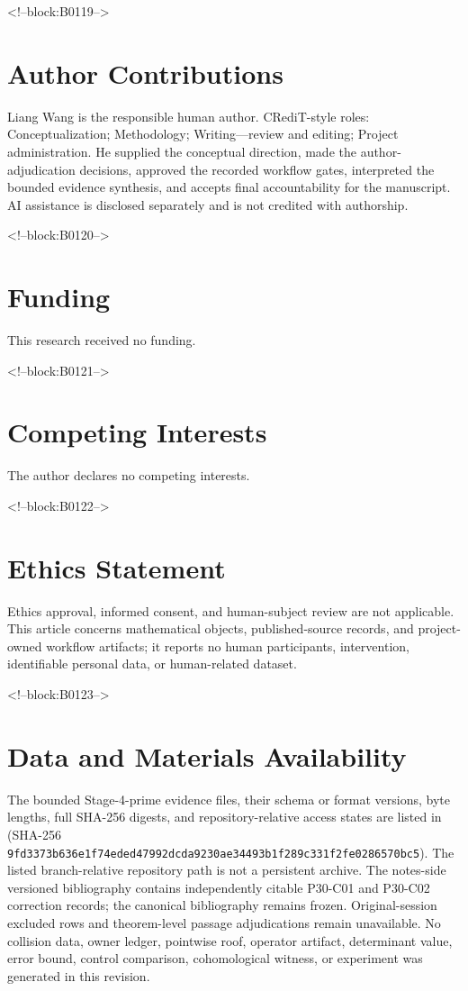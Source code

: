 \documentclass[11pt,a4paper]{article}
\begin{document}
<!--block:B0119-->
\section*{Author Contributions}
Liang Wang is the responsible human author. CRediT-style roles: Conceptualization; Methodology; Writing---review and editing; Project administration. He supplied the conceptual direction, made the author-adjudication decisions, approved the recorded workflow gates, interpreted the bounded evidence synthesis, and accepts final accountability for the manuscript. AI assistance is disclosed separately and is not credited with authorship.

<!--block:B0120-->
\section*{Funding}
This research received no funding.

<!--block:B0121-->
\section*{Competing Interests}
The author declares no competing interests.

<!--block:B0122-->
\section*{Ethics Statement}
Ethics approval, informed consent, and human-subject review are not applicable. This article concerns mathematical objects, published-source records, and project-owned workflow artifacts; it reports no human participants, intervention, identifiable personal data, or human-related dataset.

<!--block:B0123-->
\section*{Data and Materials Availability}
The bounded Stage-4-prime evidence files, their schema or format versions,
byte lengths, full SHA-256 digests, and repository-relative access states are
listed in 
(SHA-256 \texttt{9fd3373b636e1f74\allowbreak eded47992dcda923\allowbreak 0ae34493b1f289c3\allowbreak 31f2fe0286570bc5}).  The listed branch-relative repository path
is not a persistent archive.  The notes-side versioned bibliography contains
independently citable P30-C01 and P30-C02 correction records; the canonical
bibliography remains frozen.  Original-session excluded rows and theorem-level
passage adjudications remain unavailable.  No collision data, owner ledger,
pointwise roof, operator artifact, determinant value, error bound, control
comparison, cohomological witness, or experiment was generated in this revision.
\end{document}
